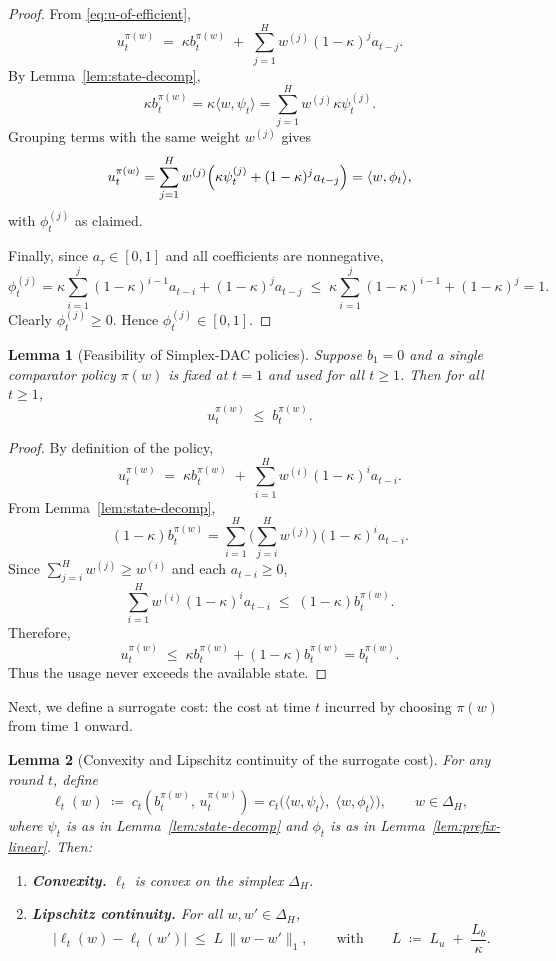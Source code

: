 \documentclass[11pt]{article}
\newtheorem{Thm:Lemma}{Lemma}
\begin{document}
\begin{proof}
From \eqref{eq:u-of-efficient},
\[
u_t^{\pi(w)} \;=\; \kappa b_t^{\pi(w)} \;+\; \sum_{j=1}^H w^{(j)} (1-\kappa)^j a_{t-j}.
\]
By Lemma~\ref{lem:state-decomp},
\[
\kappa b_t^{\pi(w)}
= \kappa\langle w,\psi_t\rangle
= \sum_{j=1}^H w^{(j)} \kappa \psi_t^{(j)}.
\]
Grouping terms with the same weight \(w^{(j)}\) gives
\[
u_t^{\pi(w)}
= \sum_{j=1}^H w^{(j)} \Bigl(\kappa \psi_t^{(j)} + (1-\kappa)^j a_{t-j}\Bigr)
= \langle w,\phi_t\rangle,
\]
with \(\phi_t^{(j)}\) as claimed.

Finally, since \(a_\tau \in [0,1]\) and all coefficients are nonnegative,
\[
\phi_t^{(j)}
= \kappa \sum_{i=1}^{j} (1-\kappa)^{i-1} a_{t-i} + (1-\kappa)^j a_{t-j}
\;\leq\;
\kappa \sum_{i=1}^{j} (1-\kappa)^{i-1} + (1-\kappa)^j
= 1.
\]
Clearly \(\phi_t^{(j)} \ge 0\). Hence \(\phi_t^{(j)}\in[0,1]\).
\end{proof}



\begin{Thm:Lemma}[Feasibility of Simplex-DAC policies]
\label{lem:feasible}
Suppose \(b_1=0\) and a single comparator policy \(\pi(w)\) is fixed at \(t=1\) and used for all \(t \ge 1\).  
Then for all \(t \ge 1\),
\[
u_t^{\pi(w)} \;\le\; b_t^{\pi(w)}.
\]
\end{Thm:Lemma}

\begin{proof}
By definition of the policy,
\[
u_t^{\pi(w)} \;=\; \kappa b_t^{\pi(w)} \;+\; \sum_{i=1}^H w^{(i)} (1-\kappa)^i a_{t-i}.
\]
From Lemma~\ref{lem:state-decomp},
\[
(1-\kappa)b_t^{\pi(w)} 
= \sum_{i=1}^H 
\Biggl(\sum_{j=i}^H w^{(j)}\Biggr) (1-\kappa)^i a_{t-i}.
\]
Since \(\sum_{j=i}^H w^{(j)} \ge w^{(i)}\) and each \(a_{t-i}\ge 0\),
\[
\sum_{i=1}^H w^{(i)} (1-\kappa)^i a_{t-i}
\;\le\; (1-\kappa)b_t^{\pi(w)}.
\]
Therefore,
\[
u_t^{\pi(w)}
\;\le\; \kappa b_t^{\pi(w)} + (1-\kappa)b_t^{\pi(w)}
= b_t^{\pi(w)}.
\]
Thus the usage never exceeds the available state.
\end{proof}



Next, we define a surrogate cost: the cost at time \(t\) incurred by choosing \(\pi(w)\) from time \(1\) onward.

\begin{Thm:Lemma}[Convexity and Lipschitz continuity of the surrogate cost]
\label{lem:surrogate-props}
For any round \(t\), define
\[
\ell_t(w) \;\coloneqq\; 
c_t\!\left(
b_t^{\pi(w)},\,u_t^{\pi(w)}\right)
=
c_t\!\big(\langle w,\psi_t\rangle,\;\langle w,\phi_t\rangle\big),
\qquad w\in\Delta_H,
\]
where \(\psi_t\) is as in Lemma~\ref{lem:state-decomp} and \(\phi_t\) is as in Lemma~\ref{lem:prefix-linear}. Then:
\begin{enumerate}
    \item \textbf{Convexity.} \(\ell_t\) is convex on the simplex \(\Delta_H\).
    \item \textbf{Lipschitz continuity.} For all \(w,w'\in\Delta_H\),
    \[
    |\ell_t(w)-\ell_t(w')| \;\le\; L\,\|w-w'\|_1,
    \qquad\text{with}\qquad
    L \;\coloneqq\; L_u \;+\; \frac{L_b}{\kappa}.
    \]
\end{enumerate}
\end{Thm:Lemma}
\end{document}
